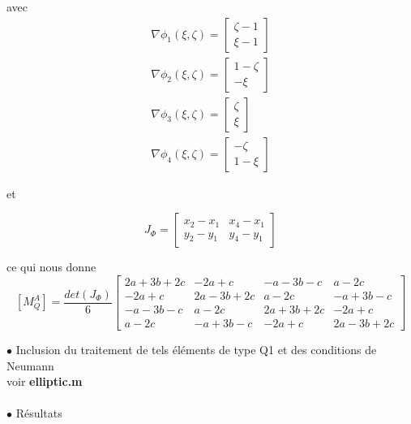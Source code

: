 \documentclass{article}
\begin{document}
avec 
\begin{gather*} 
    \nabla \phi_1(\xi, \zeta) = 
    \begin{bmatrix}
        \zeta - 1 \\
        \xi - 1
    \end{bmatrix} \\
    \nabla \phi_2(\xi, \zeta) = 
    \begin{bmatrix}
        1 - \zeta  \\
        - \xi
    \end{bmatrix} \\
    \nabla \phi_3(\xi, \zeta) = 
    \begin{bmatrix}
        \zeta  \\
        \xi
    \end{bmatrix} \\
    \nabla \phi_4(\xi, \zeta) = 
    \begin{bmatrix}
        -\zeta  \\
        1 - \xi
    \end{bmatrix}
\end{gather*}

et 

$$
J_{\Phi} = 
\begin{bmatrix}
    x_2 - x_1 & x_4 - x_1 \\
    y_2 - y_1 & y_4 - y_1
\end{bmatrix}
$$

ce qui nous donne
$$
[M_{Q}^{A}] = \frac{det(J_{\Phi})}{6}
\begin{bmatrix}
    2a+3b+2c & -2a+c & -a-3b-c & a-2c \\
    -2a+c & 2a-3b+2c & a-2c & -a+3b-c \\
    -a-3b-c & a-2c & 2a+3b+2c & -2a+c \\
    a-2c & -a+3b-c & -2a+c & 2a-3b+2c 
\end{bmatrix}
$$

$\bullet$ Inclusion du traitement de tels éléments de type Q1 et des conditions de Neumann \\ 

voir \textbf{elliptic.m} \\ \\ 

$\bullet$ Résultats \\
\end{document}
